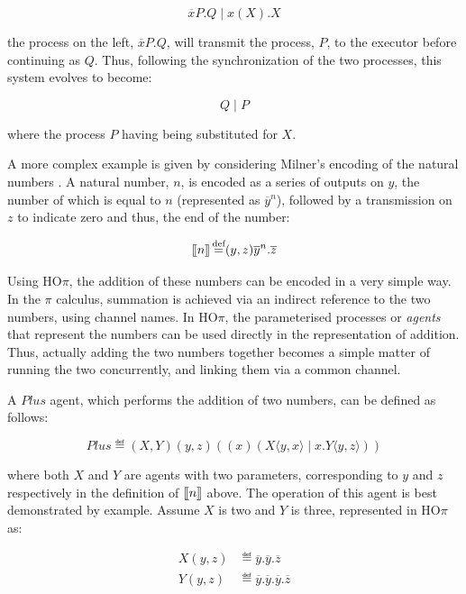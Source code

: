 \begin{equation}
\overline{x}P.Q\;|\;x(X).X
\end{equation}

\noindent the process on the left, $\overline{x}P.Q$, will transmit
the process, $P$, to the executor before continuing as $Q$.  Thus,
following the synchronization of the two processes, this system
evolves to become:

\begin{equation}
Q\;|\;P
\end{equation}

\noindent where the process $P$ having being substituted for $X$.  

A more complex example is given by considering Milner's encoding of
the natural numbers \cite{milner:93polyadic}.  A natural number, $n$,
is encoded as a series of outputs on $y$, the number of which is equal
to $n$ (represented as $\overline{y}^n$), followed by a transmission
on $z$ to indicate zero and thus, the end of the number:

\begin{equation}
[\hspace{-0.3ex}[ n ]\hspace{-0.3ex}] \operatorname{\stackrel{\textrm{def}}{=}} (y,z)\overline{y}^n.\overline{z}
\end{equation}

\noindent Using HO$\pi$, the addition of these numbers can be encoded
in a very simple way.  In the $\pi$ calculus, summation is achieved
via an indirect reference to the two numbers, using channel names.  In
HO$\pi$, the parameterised processes or \emph{agents} that represent
the numbers can be used directly in the representation of addition.
Thus, actually adding the two numbers together becomes a simple matter
of running the two concurrently, and linking them via a common
channel.

A $Plus$ agent, which performs the addition of two numbers, can be
defined as follows:

\begin{equation}
Plus \eqdef (X,Y)(y,z)((x)(X\langle y,x\rangle \;|\;x.Y\langle y,z\rangle ))
\end{equation}

\noindent where both $X$ and $Y$ are agents with two parameters,
corresponding to $y$ and $z$ respectively in the definition of $[\hspace{-0.3ex}[
n ]\hspace{-0.3ex}]$ above.  The operation of this agent is best demonstrated by
example.  Assume $X$ is two and $Y$ is three, represented in HO$\pi$ as:

\begin{align}
X(y,z) & \eqdef \overline{y}.\overline{y}.\overline{z} \\
Y(y,z) & \eqdef \overline{y}.\overline{y}.\overline{y}.\overline{z}
\end{align}

